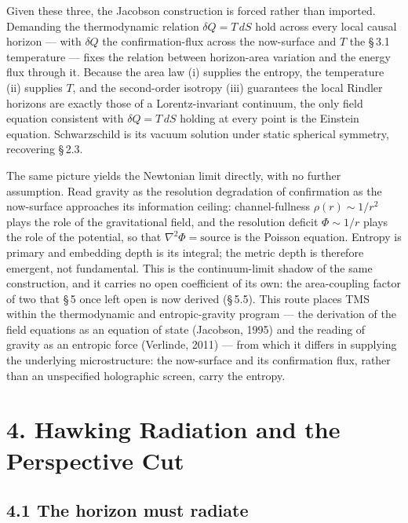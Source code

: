 \documentclass[11pt,oneside]{report}
\theoremstyle{definition}
\theoremstyle{remark}
\begin{document}
Given these three, the Jacobson construction is forced rather than
imported. Demanding the thermodynamic relation \ensuremath{\delta Q = T\,
dS} hold across every local causal horizon --- with \ensuremath{\delta Q}
the confirmation-flux across the now-surface and \ensuremath{T} the
\S\,3.1 temperature --- fixes the relation between horizon-area variation
and the energy flux through it. Because the area law (i) supplies the
entropy, the temperature (ii) supplies \ensuremath{T}, and the
second-order isotropy (iii) guarantees the local Rindler horizons are
exactly those of a Lorentz-invariant continuum, the only field equation
consistent with \ensuremath{\delta Q = T\, dS} holding at every point is
the Einstein equation. Schwarzschild is its vacuum solution under static
spherical symmetry, recovering \S\,2.3.

The same picture yields the Newtonian limit directly, with no further
assumption. Read gravity as the resolution degradation of confirmation as
the now-surface approaches its information ceiling: channel-fullness
\ensuremath{\rho(r) \sim 1/r^2} plays the role of the gravitational field,
and the resolution deficit \ensuremath{\Phi \sim 1/r} plays the role of
the potential, so that \ensuremath{\nabla^2 \Phi = \mathrm{source}} is the
Poisson equation. Entropy is primary and embedding depth is its integral;
the metric depth is therefore emergent, not fundamental. This is the
continuum-limit shadow of the same construction, and it carries no open
coefficient of its own: the area-coupling factor of two that \S\,5 once
left open is now derived (\S\,5.5). This route places TMS within the
thermodynamic and entropic-gravity
program --- the derivation of the field equations as an equation of state
(Jacobson, 1995) and the reading of gravity as an entropic force
(Verlinde, 2011) --- from which it differs in supplying the underlying
microstructure: the now-surface and its confirmation flux, rather than an
unspecified holographic screen, carry the entropy.

\section*{4. Hawking Radiation and the Perspective Cut}

\subsection*{4.1 The horizon must radiate}
\end{document}
